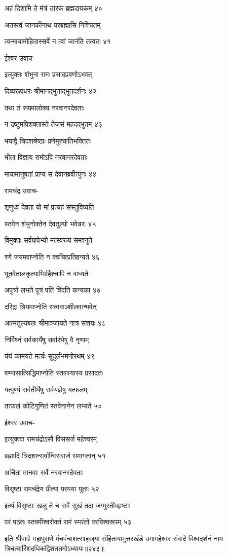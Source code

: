 अहं दिशामि ते मंत्रं तारकं ब्रह्मदायकम् ४०

अतस्त्वं जानकीनाथ परब्रह्मासि निश्चितम्

त्वन्मायामोहितास्सर्वे न त्वां जानंति तत्वतः ४१

ईश्वर उवाच-

इत्युक्तः शंभुना रामः प्रसादप्रवणोऽभवत्

दिव्यरूपधरः श्रीमानद्भुताद्भुतदर्शनः ४२

तथा तं रूपमालोक्य नरवानरदेवताः

न द्रष्टुमपिशक्तास्ते तेजसं महदद्भुतम् ४३

भयाद्वै त्रिदशश्रेष्ठाः प्रणेमुश्चातिभक्तितः

भीता विज्ञाय रामोऽपि नरवानरदेवताः

मायामानुषतां प्राप्य स देवानब्रवीत्पुनः ४४

रामचंद्र उवाच-

शृणुध्वं देवता यो मां प्रत्यहं संस्तुविष्यति

स्तवेन शंभुनोक्तेन देवतुल्यो भवेन्नरः ४५

विमुक्तः सर्वपापेभ्यो मत्स्वरूपं समश्नुते

रणे जयमवाप्नोति न क्वचित्प्रतिहन्यते ४६

भूतवेतालकृत्याभिर्ग्रहैश्चापि न बाध्यते

अपुत्रो लभते पुत्रं पतिं विंदति कन्यका ४७

दरिद्रः श्रियमाप्नोति सत्ववाञ्शीलवान्भवेत्

आत्मतुल्यबलः श्रीमाञ्जायते नात्र संशयः ४८

निर्विघ्नं सर्वकार्येषु सर्वारंभेषु वै नृणाम्

यंयं कामयते मर्त्यः सुदुर्लभमनोरथम् ४९

षण्मासात्सिद्धिमाप्नोति स्तवस्यास्य प्रसादतः

यत्पुण्यं सर्वतीर्थेषु सर्वयज्ञेषु यत्फलम्

तत्फलं कोटिगुणितं स्तवेनानेन लभ्यते ५०

ईश्वर उवाच-

इत्युक्त्वा रामचंद्रोऽसौ विससर्ज महेश्वरम्

ब्रह्मादि त्रिदशान्सर्वान्विससर्ज समागतान् ५१

अर्चिता मानवाः सर्वे नरवानरदेवताः

विसृष्टा रामचंद्रेण प्रीत्या परमया युताः ५२

इत्थं विसृष्टाः खलु ते च सर्वे सुखं तदा जग्मुरतीवहृष्टाः

परं पठंतः स्तवमीश्वरोक्तं रामं स्मरंतो वरविश्वरूपम् ५३

इति श्रीपाद्मे महापुराणे पंचपंचाशत्साहस्र्यां संहितायामुत्तरखंडे उमामहेश्वर संवादे विश्वदर्शनं नाम त्रिचत्वारिंशदधिकद्विशततमोऽध्यायः॥२४३॥

